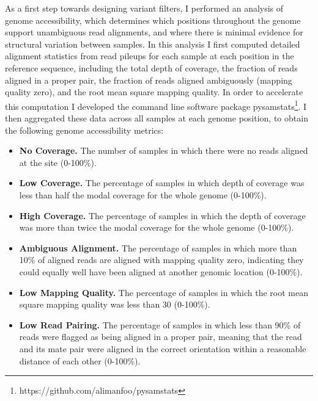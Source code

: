 \documentclass[a4paper,11pt,abstracton,hidelinks]{scrartcl}
\begin{document}
As a first step towards designing variant filters, I performed an analysis of genome accessibility, which determines which positions throughout the genome support unambiguous read alignments, and where there is minimal evidence for structural variation between samples. 
%
In this analysis I first computed detailed alignment statistics from read pileups for each sample at each position in the reference sequence, including the total depth of coverage, the fraction of reads aligned in a proper pair, the fraction of reads aligned ambiguously (mapping quality zero), and the root mean square mapping quality.
%
In order to accelerate this computation I developed the command line software package pysamstats\footnote{https://github.com/alimanfoo/pysamstats}.
%
I then aggregated these data across all samples at each genome position, to obtain the following genome accessibility metrics:
%
\begin{itemize}
%
\item \textbf{No Coverage.} The number of samples in which there were no reads aligned at the site (0-100\%).
%
\item \textbf{Low Coverage.} The percentage of samples in which depth of coverage was less than half the modal coverage for the whole genome (0-100\%).
%
\item \textbf{High Coverage.} The percentage of samples in which the depth of coverage was more than twice the modal coverage for the whole genome (0-100\%).
%
\item \textbf{Ambiguous Alignment.} The percentage of samples in which more than 10\% of aligned reads are aligned with mapping quality zero, indicating they could equally well have been aligned at another genomic location (0-100\%).
%
\item \textbf{Low Mapping Quality.} The percentage of samples in which the root mean square mapping quality was less than 30 (0-100\%).
%  
\item \textbf{Low Read Pairing.} The percentage of samples in which less than 90\% of reads were flagged as being aligned in a proper pair, meaning that the read and its mate pair were aligned in the correct orientation within a reasonable distance of each other (0-100\%).
\end{itemize}
\end{document}
